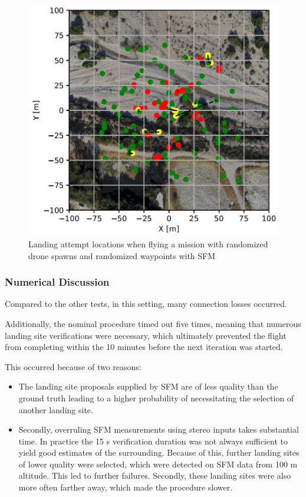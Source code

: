     \begin{figure}[h]
    \centering
    \includegraphics[scale=0.5]{images/evaluation/landing_SFM.png}
    \caption{Landing attempt locations when flying a mission with randomized drone spawns and randomized waypoints with SFM}
    \label{fig:land_SFM} 
    \end{figure}


    \subsubsection{Numerical Discussion}
    Compared to the other tests, in this setting, many connection losses occurred. 
    
    Additionally, the nominal procedure timed out five times, meaning that numerous landing site verifications were necessary, which ultimately prevented the flight from completing within the 10 minutes before the next iteration was started. 

    This occurred because of two reasons:

    \begin{itemize}
        \item The landing site proposals supplied by SFM are of less quality than the ground truth leading to a higher probability of necessitating the selection of another landing site. 
        \item Secondly, overruling SFM measurements using stereo inputs takes substantial time. In practice the 15 s verification duration was not always sufficient to yield good estimates of the surrounding. Because of this, further landing sites of lower quality were selected, which were detected on SFM data from 100 m altitude. This led to further failures. Secondly, these landing sites were also more often farther away, which made the procedure slower.
    \end{itemize}

